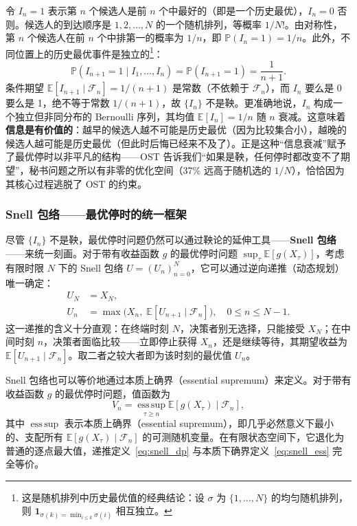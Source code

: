 令 $I_n = 1$ 表示第 $n$ 个候选人是前 $n$ 个中最好的（即是一个历史最优），$I_n = 0$ 否则。候选人的到达顺序是 $1, 2, \dots, N$ 的一个随机排列，等概率 $1/N!$。由对称性，第 $n$ 个候选人在前 $n$ 个中排第一的概率为 $1/n$，即 $\mathbb{P}(I_n = 1) = 1/n$。此外，不同位置上的历史最优事件是独立的\footnote{这是随机排列中历史最优值的经典结论：设 $\sigma$ 为 $\{1,\dots,N\}$ 的均匀随机排列，则 $\mathbf{1}_{\sigma(k) = \min_{i \leqslant k} \sigma(i)}$ 相互独立。}：
\begin{equation}
  \mathbb{P}(I_{n+1} = 1 \mid I_1, \dots, I_n) = \mathbb{P}(I_{n+1} = 1) = \frac{1}{n+1}.
\end{equation}
条件期望 $\mathbb{E}[I_{n+1} \mid \mathcal{F}_n] = 1/(n+1)$ 是常数（不依赖于 $\mathcal{F}_n$），而 $I_n$ 要么是 0 要么是 1，绝不等于常数 $1/(n+1)$，故 $\{I_n\}$ 不是鞅。更准确地说，$I_n$ 构成一个独立但非同分布的 Bernoulli 序列，其均值 $\mathbb{E}[I_n] = 1/n$ 随 $n$ 衰减。这意味着\textbf{信息是有价值的}：越早的候选人越不可能是历史最优（因为比较集合小），越晚的候选人越可能是历史最优（但此时后悔已经来不及了）。正是这种``信息衰减''赋予了最优停时以非平凡的结构——OST 告诉我们``如果是鞅，任何停时都改变不了期望''，秘书问题之所以有非零的优化空间（37\% 远高于随机选的 $1/N$），恰恰因为其核心过程逃脱了 OST 的约束。

\subsubsection{Snell 包络——最优停时的统一框架}

尽管 $\{I_n\}$ 不是鞅，最优停时问题仍然可以通过鞅论的延伸工具——\textbf{Snell 包络}\cite{williams1991probability}——来统一刻画。对于带有收益函数 $g$ 的最优停时问题 $\sup_\tau \mathbb{E}[g(X_\tau)]$，考虑有限时限 $N$ 下的 Snell 包络 $U = (U_n)_{n=0}^N$，它可以通过逆向递推（动态规划）唯一确定：
\begin{equation}\label{eq:snell_dp}
\begin{aligned}
  U_N &= X_N, \\
  U_n &= \max\big(X_n,\; \mathbb{E}[U_{n+1} \mid \mathcal{F}_n]\big), \quad 0 \leqslant n \leqslant N-1.
\end{aligned}
\end{equation}
这一递推的含义十分直观：在终端时刻 $N$，决策者别无选择，只能接受 $X_N$；在中间时刻 $n$，决策者面临比较——立即停止获得 $X_n$，还是继续等待，其期望收益为 $\mathbb{E}[U_{n+1} \mid \mathcal{F}_n]$。取二者之较大者即为该时刻的最优值 $U_n$。

Snell 包络也可以等价地通过本质上确界（essential supremum）来定义。对于带有收益函数 $g$ 的最优停时问题，值函数为
\begin{equation}\label{eq:snell_ess}
  V_n = \operatorname*{ess\,sup}_{\tau \geqslant n} \mathbb{E}[g(X_\tau) \mid \mathcal{F}_n],
\end{equation}
其中 $\operatorname*{ess\,sup}$ 表示本质上确界（essential supremum），即几乎必然意义下最小的、支配所有 $\mathbb{E}[g(X_\tau) \mid \mathcal{F}_n]$ 的可测随机变量。在有限状态空间下，它退化为普通的逐点最大值，递推定义~\eqref{eq:snell_dp} 与本质下确界定义~\eqref{eq:snell_ess} 完全等价。

